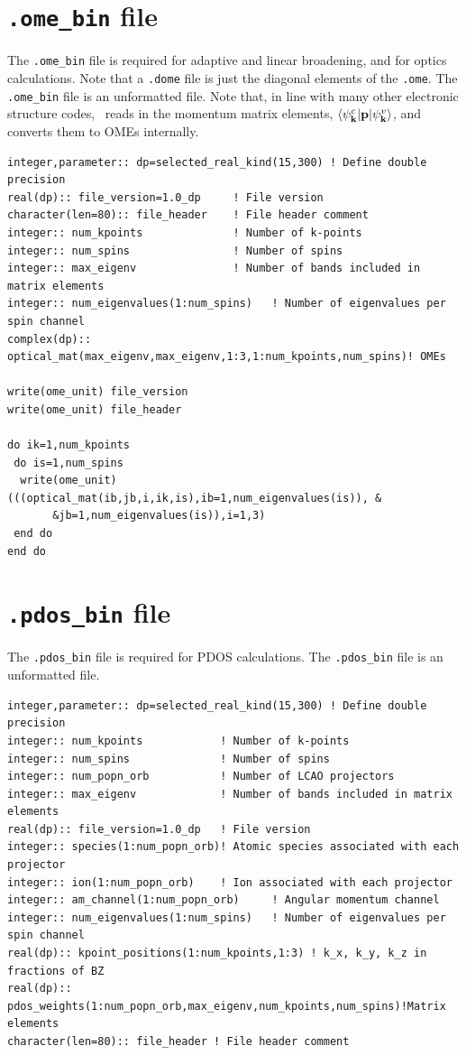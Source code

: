 \documentclass[a4paper,11pt,twoside]{book}
\begin{document}
{\begin{appendix}
\section{\texttt{.ome\_bin} file}
The \texttt{.ome\_bin} file is required for adaptive and linear broadening, and for optics calculations.
%
Note that a \texttt{.dome} file is just the diagonal elements of the \texttt{.ome}.
%
The \texttt{.ome\_bin} file is an unformatted file.
%
Note that, in line with many other electronic structure codes, \optados\ reads in the momentum matrix elements, $\langle \psi^c_{\bf k}  |  {\bf p} | \psi^v_{\bf k} \rangle$, and converts them to OMEs internally.
\begin{verbatim}
integer,parameter:: dp=selected_real_kind(15,300) ! Define double precision
real(dp):: file_version=1.0_dp     ! File version
character(len=80):: file_header    ! File header comment
integer:: num_kpoints              ! Number of k-points
integer:: num_spins                ! Number of spins
integer:: max_eigenv               ! Number of bands included in matrix elements
integer:: num_eigenvalues(1:num_spins)   ! Number of eigenvalues per spin channel
complex(dp):: optical_mat(max_eigenv,max_eigenv,1:3,1:num_kpoints,num_spins)! OMEs

write(ome_unit) file_version
write(ome_unit) file_header

do ik=1,num_kpoints
 do is=1,num_spins
  write(ome_unit) (((optical_mat(ib,jb,i,ik,is),ib=1,num_eigenvalues(is)), &
       &jb=1,num_eigenvalues(is)),i=1,3)
 end do
end do
\end{verbatim}
\section{\texttt{.pdos\_bin} file}
The \texttt{.pdos\_bin} file is required for PDOS calculations.
%
The \texttt{.pdos\_bin} file is an unformatted file.
\begin{verbatim}
integer,parameter:: dp=selected_real_kind(15,300) ! Define double precision
integer:: num_kpoints            ! Number of k-points
integer:: num_spins              ! Number of spins
integer:: num_popn_orb           ! Number of LCAO projectors
integer:: max_eigenv             ! Number of bands included in matrix elements
real(dp):: file_version=1.0_dp   ! File version
integer:: species(1:num_popn_orb)! Atomic species associated with each projector
integer:: ion(1:num_popn_orb)    ! Ion associated with each projector
integer:: am_channel(1:num_popn_orb)     ! Angular momentum channel
integer:: num_eigenvalues(1:num_spins)   ! Number of eigenvalues per spin channel
real(dp):: kpoint_positions(1:num_kpoints,1:3) ! k_x, k_y, k_z in fractions of BZ
real(dp):: pdos_weights(1:num_popn_orb,max_eigenv,num_kpoints,num_spins)!Matrix elements
character(len=80):: file_header ! File header comment


\end{verbatim}
\end{appendix}}
\end{document}
